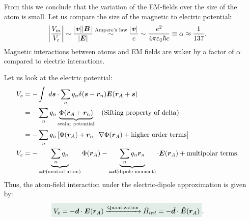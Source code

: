 From this we conclude that the variation of the EM-fields over the size of the atom is small.
Let us compare the size of the magnetic to electric potential:
\begin{align}
    \left|\frac{V_m}{V_e}\right|\sim\frac{|\bm{v}||\bm{B}|}{|\bm{E}|}\stackrel{\text{Ampere's law}}{\sim}\frac{|\bm{v}|}{c}\sim\frac{e^2}{4\pi\varepsilon_0\hbar c}\equiv\alpha\approx\frac{1}{137}.
\end{align}
Magnetic interactions between atoms and EM fields are waker by a factor of $\alpha$ compared to electric interactions.

Let us look at the electric potential:
\begin{align*}
    V_e&=-\int\;d\bm{s}\cdot\sum_nq_n\delta(\bm{s}-\bm{r}_n)\bm{E}(\bm{r}_A+\bm{s})\\
    &=-\sum_nq_n\underbrace{\Phi(\bm{r}_A+\bm{r}_n)}_{\text{scalar potential}}\quad(\text{Sifting property of delta})\\
    &=-\sum_nq_n\left[\Phi(\bm{r}_A)+\bm{r}_n\cdot\nabla\Phi(\bm{r}_A)+\text{higher order terms}\right]\\
    V_e&=-\underbrace{\sum_nq_n}_{=0(\text{neutral atom})}\Phi(\bm{r}_A)-\underbrace{\sum_nq_n\bm{r}_n}_{=\bm{d} (\text{dipole moment})}\cdot\bm{E}(\bm{r}_A)+\text{multipolar terms}.
\end{align*}
Thus, the atom-field interaction under the electric-dipole approximation is given by:
\begin{align}
    \highlight{V_e=-\bd\cdot\bE(\br_A)\xrightarrow{\text{Quantization}}\hH_{int}=-\hbd\cdot\hbE(\br_A)}.
\end{align}
